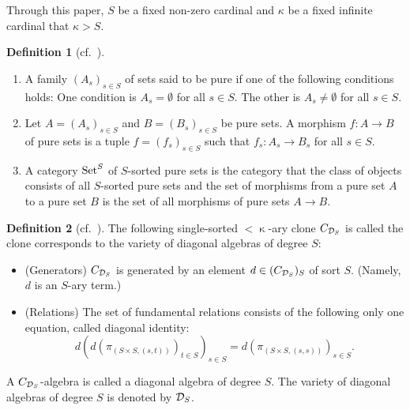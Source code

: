 \documentclass[a4paper,10pt]{article}
\theoremstyle{definition}
\newtheorem{df}{Definition}[section]
\newcommand\ra{\rightarrow}
\newcommand\Set{{\textbf{{\rm Set}}}}
\newcommand\mc{\mathclose}
\begin{document}
Through this paper, $S$ be a fixed non-zero cardinal and $\kappa$ be a fixed infinite cardinal
that $\kappa>S$.


\begin{df}[cf.\ {\cite[Definition 2.1]{MRS}}]\label{pure-set}
\mbox{}
\begin{enumerate}
\item
A family $(A_s)_{s\in S}$ of sets said to be pure
if one of the following conditions holds:
One condition is $A_s=\emptyset$ for all $s\in S$.
The other is $A_s\neq \emptyset$ for all $s\in S$.
\item
Let $A=(A_s)_{s\in S}$ and $B=(B_s)_{s\in S}$ be pure sets.
A morphism $f:A\ra B$ of pure sets is a tuple $f=(f_s)_{s\in S}$ such that
$f_s:A_s\ra B_s$ for all $s\in S$.
\item
A category $\Set^S$ of $S$-sorted pure sets is the category that the class of objects consists of all $S$-sorted pure sets
and the set of morphisms from a pure set $A$ to a pure set $B$ is
the set of all morphisms of pure sets $A\ra B$.
\end{enumerate}
\end{df}

\begin{df}[cf.\ {\cite[Definition 3.1]{MRS}}]
The following single-sorted $<\mc\kappa$-ary clone $C_{{\cal D}_S}$
is called the clone corresponds
to the variety of diagonal algebras of degree $S$:
\begin{itemize}
\item (Generators)
$C_{{\cal D}_S}$ is generated by an element $d\in (C_{{\cal D}_S})_S$ of sort $S$.
(Namely, $d$ is an $S$-ary term.)
\item (Relations)
The set of fundamental relations consists of the following only one equation,
called diagonal identity:
\[
d(d(\pi_{(S\times S,(s,t))})_{t\in S})_{s\in S}=d(\pi_{(S\times S,(s,s))})_{s\in S}.
\]
\end{itemize}
A $C_{{\cal D}_S}$-algebra is called a diagonal algebra of degree $S$.
The variety of diagonal algebras of degree $S$ is denoted by ${\cal D}_S$.
\end{df}
\end{document}
